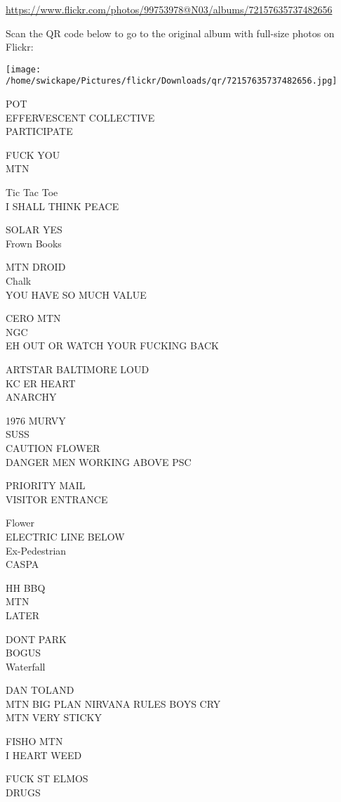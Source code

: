 \documentclass[10pt,letterpaper]{article}
\begin{document}
\url{https://www.flickr.com/photos/99753978@N03/albums/72157635737482656}

Scan the QR code below to go to the original album with full-size photos on Flickr:

\texttt{[image: /home/swickape/Pictures/flickr/Downloads/qr/72157635737482656.jpg]}
\pagebreak

POT\\
EFFERVESCENT COLLECTIVE\\
PARTICIPATE

FUCK YOU\\
MTN

Tic Tac Toe\\
I SHALL THINK PEACE

SOLAR YES\\
Frown Books

MTN DROID\\
Chalk\\
YOU HAVE SO MUCH VALUE

CERO MTN\\
NGC\\
EH OUT OR WATCH YOUR FUCKING BACK

ARTSTAR BALTIMORE LOUD\\
KC ER HEART\\
ANARCHY

1976 MURVY\\
SUSS\\
CAUTION FLOWER\\
DANGER MEN WORKING ABOVE PSC

PRIORITY MAIL\\
VISITOR ENTRANCE

Flower\\
ELECTRIC LINE BELOW\\
Ex{-}Pedestrian\\
CASPA

HH BBQ\\
MTN\\
LATER

DONT PARK\\
BOGUS\\
Waterfall

DAN TOLAND\\
MTN BIG PLAN NIRVANA RULES BOYS CRY\\
MTN VERY STICKY

FISHO MTN\\
I HEART WEED

FUCK ST ELMOS\\
DRUGS
\end{document}
